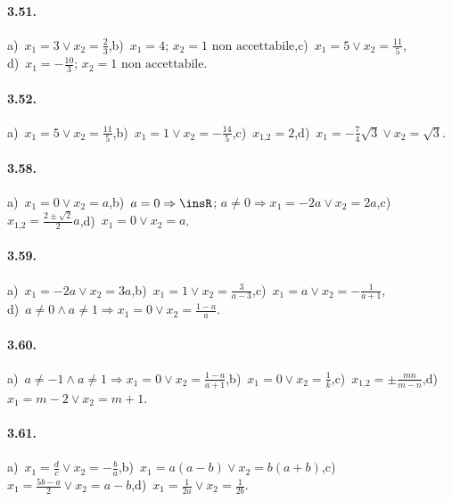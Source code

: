 \paragraph{3.51.} a)~$x_{1} =3 \vee x_{2} =\frac{2}{3}$,\quad b)~$x_{1} =4;\,x_{2} =1\text{ non accettabile}$,\quad c)~$x_{1} =5 \vee x_{2} =\frac{11}{5}$,\protect\\
d)~$x_{1} =-\frac{10}{3};\,x_{2} =1\text{ non accettabile}$.

\paragraph{3.52.} a)~$x_{1} =5 \vee x_{2} =\frac{11}{5}$,\quad b)~$x_{1} =1 \vee x_{2} =-\frac{14}{5}$,\quad c)~$x_{1\text{,}2} =2$,\quad d)~$x_{1} =-\frac{7}{4}\sqrt{3} \vee x_{2} =\sqrt{3}$.
\paragraph{3.58.} a)~$x_{1} = 0 \vee x_{2} = a$,\quad b)~$a = 0 \Rightarrow \insR$; $a \neq 0 \Rightarrow x_{1}=-2 a \vee x_{2} = 2 a$,\quad c)~$x_{1\text{,}2} = \frac{2\pm\sqrt{2}}{2} a$,\quad d)~$x_{1} = 0 \vee x_{2} = a$.

\paragraph{3.59.} a)~$x_{1} =-2 a \vee x_{2} = 3 a$,\quad b)~$x_{1} = 1 \vee x_{2} = \frac{3}{a-3}$,\quad c)~$x_{1} = a \vee x_{2} =-\frac{1}{a + 1}$,\protect\\ \quad d)~$a \neq 0 \wedge a \neq 1 \Rightarrow x_{1} = 0 \vee x _{2} = \frac{1-a}{a}$.

\paragraph{3.60.} a)~$a \neq-1 \wedge a \neq 1 \Rightarrow x_{1} = 0 \vee x_{2} = \frac{1-a}{a + 1}$,\quad b)~$x_{1} = 0 \vee x_{2} = \frac{1}{k}$,\quad c)~$x_{1\text{,}2} = \pm \frac{mn}{m-n}$,\quad d)~$x_{1} = m-2 \vee x_{2} = m + 1$.

\paragraph{3.61.} a)~$x_{1} = \frac{d}{c} \vee x_{2} = -\frac{b}{a}$,\quad b)~$x_{1} =a(a-b) \vee x_{2} = b(a+b)$,\quad c)~$x_{1} =\frac{5b-a}{2} \vee x_{2} = a-b$,\quad d)~$x_{1} =\frac{1}{2a} \vee x_{2} =\frac{1}{2b}$.

